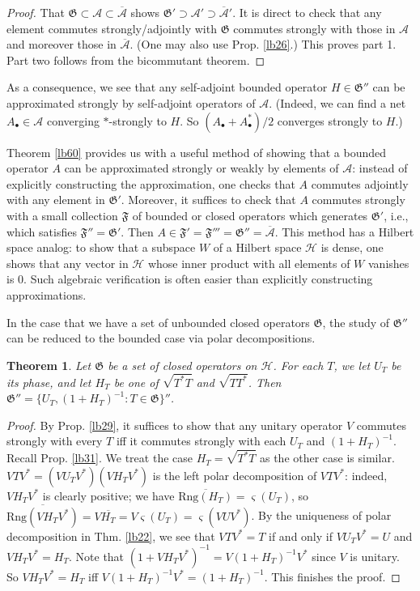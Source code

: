 \documentclass[12pt,a4paper,notitlepage]{article}
\theoremstyle{definition}
\theoremstyle{plain}
\newtheorem{thm}[df]{Theorem}
\newcommand{\fk}{\mathfrak}
\newcommand{\mc}{\mathcal}
\newcommand{\ovl}{\overline}
\newcommand{\sgm}{\varsigma}
\newcommand{\blt}{\bullet}
\newcommand{\Rng}{\mathrm{Rng}}
\numberwithin{equation}{section}
\begin{document}
\begin{proof}
That $\fk G\subset\mc A\subset\ovl{\mc A}$ shows $\fk G'\supset\mc A'\supset\ovl{\mc A}'$. It is direct to check that any element commutes strongly/adjointly with $\fk G$ commutes strongly with those in $\mc A$ and moreover those in $\ovl{\mc A}$. (One may also use Prop. \ref{lb26}.)	This proves part 1. Part two follows from the bicommutant theorem.
\end{proof}


As a consequence, we see that any self-adjoint bounded operator $H\in\fk G''$ can be approximated strongly by self-adjoint operators of $\mc A$. (Indeed, we can find a net $A_\blt\in\mc A$ converging $*$-strongly to $H$. So $(A_\blt+A^*_\blt)/2$ converges strongly to $H$.)


Theorem \ref{lb60} provides us with a useful method of showing that a bounded operator $A$ can be approximated strongly or weakly by elements of $\mc A$: instead of explicitly constructing the approximation, one checks that $A$ commutes adjointly with any element in $\fk G'$. Moreover, it suffices to check that $A$ commutes strongly with a small collection $\fk F$ of bounded or closed operators  which generates $\fk G'$, i.e., which satisfies $\fk F''=\fk G'$. Then $A\in \fk F'=\fk F'''=\fk G''=\ovl{\mc A}$. This method has a Hilbert space analog: to show that a subspace $W$ of a Hilbert space $\mc H$ is dense, one shows that any vector in $\mc H$ whose inner product with all elements of $W$ vanishes is $0$. Such algebraic verification is often easier than explicitly constructing approximations.


In the case that we have a set of unbounded closed operators $\fk G$, the study of $\fk G''$ can be reduced to the bounded case via polar decompositions.

\begin{thm}\label{lb30}
Let $\fk G$ be a set of closed operators on $\mc H$. For each $T$, we let $U_T$ be its phase, and let $H_T$ be one of $\sqrt{T^*T}$ and $\sqrt{TT^*}$. Then $\fk G''=\{U_T,(1+H_T)^{-1}:T\in\fk G\}''$.
\end{thm}

\begin{proof}
By Prop. \ref{lb29}, it suffices to show that any unitary operator $V$ commutes strongly with every $T$ iff it commutes strongly with each $U_T$ and $(1+H_T)^{-1}$. Recall Prop. \ref{lb31}. We treat the case  $H_T=\sqrt{T^*T}$ as the other case is similar. $VTV^*=(VU_TV^*)(VH_TV^*)$ is the left polar decomposition of $VTV^*$: indeed, $VH_TV^*$ is clearly positive; we have $\ovl{\Rng(H_T)}=\sgm(U_T)$, so $\ovl{\Rng(VH_TV^*)}=V\ovl{H_T}=V\sgm(U_T)=\sgm(VUV^*)$. By the uniqueness of polar decomposition in Thm. \ref{lb22}, we see that $VTV^*=T$ if and only if $VU_TV^*=U$ and $VH_TV^*=H_T$. Note that $(1+VH_TV^*)^{-1}=V(1+H_T)^{-1}V^*$ since $V$ is unitary. So $VH_TV^*=H_T$ iff $V(1+H_T)^{-1}V^*=(1+H_T)^{-1}$. This finishes the proof.
\end{proof}
\end{document}
